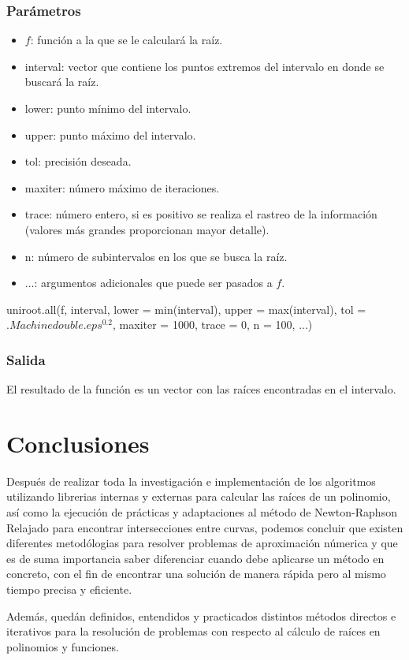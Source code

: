 \documentclass[a4paper,12pt]{article}
\begin{document}

\subsubsection{Parámetros}
\begin{itemize}
    \item $f$: función a la que se le calculará la raíz.
    \item interval:  vector que contiene los puntos extremos del intervalo en donde se buscará la raíz.
    \item lower: punto mínimo del intervalo.
    \item upper: punto máximo del intervalo.
    \item tol: precisión deseada.
    \item maxiter: número máximo de iteraciones.
    \item trace: número entero, si es positivo se realiza el rastreo de la información (valores más grandes proporcionan mayor detalle).
    \item n: número de subintervalos en los que se busca la raíz.
    \item ...: argumentos adicionales que puede ser pasados a $f$.
\end{itemize}

uniroot.all(f, interval, lower = min(interval), upper = max(interval), 
            tol = $.Machinedouble.eps^0.2$, maxiter = 1000, 
            trace = 0, n = 100, ...)

\subsubsection{Salida}
El resultado de la función es un vector con las raíces encontradas en el intervalo.

\newpage 


\section{Conclusiones}

Después de realizar toda la investigación e implementación de los algoritmos utilizando librerias internas y externas para calcular las raíces de un polinomio, así como la ejecución de prácticas y adaptaciones al método de Newton-Raphson Relajado para encontrar intersecciones entre curvas, podemos concluir que existen diferentes metodólogias para resolver problemas de aproximación númerica y que es de suma importancia saber diferenciar cuando debe aplicarse un método en concreto, con el fin de encontrar una solución de manera rápida pero al mismo tiempo precisa y eficiente. \par
Además, quedán definidos, entendidos y practicados distintos métodos directos e iterativos para la resolución de problemas con respecto al cálculo de raíces en polinomios y funciones. \par 
\end{document}
